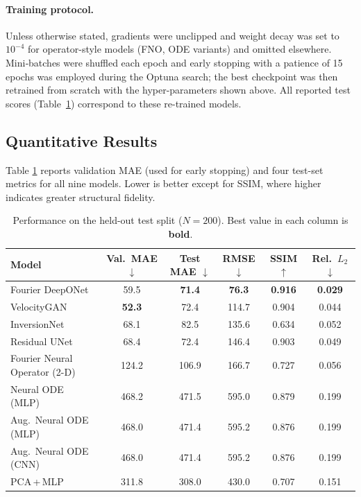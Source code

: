 \documentclass{article}
\begin{document}
\paragraph{Training protocol.}  
Unless otherwise stated, gradients were unclipped and weight decay was set to
$10^{-4}$ for operator-style models (FNO, ODE variants) and omitted elsewhere.
Mini‐batches were shuffled each epoch and early stopping with a
patience of 15 epochs was employed during the Optuna search; the best
checkpoint was then retrained from scratch with the hyper-parameters shown
above.  All reported test scores (Table~\ref{tab:quant}) correspond to these
re-trained models.

\subsection{Quantitative Results}

Table \ref{tab:quant} reports validation MAE (used for early stopping) and four
test-set metrics for all nine models.  Lower is better except for SSIM, where
higher indicates greater structural fidelity.

\begin{table}[H]
\centering
\small
\renewcommand{\arraystretch}{1.15}
\setlength{\tabcolsep}{5pt}
\begin{tabular}{@{}lccccc@{}}
\toprule
\textbf{Model} & \textbf{Val.\ MAE} $\downarrow$ & \textbf{Test MAE} $\downarrow$ & \textbf{RMSE} $\downarrow$ & \textbf{SSIM} $\uparrow$ & \textbf{Rel.\ $L_2$} $\downarrow$ \\
\midrule
Fourier DeepONet                & 59.5 & \textbf{71.4} & \textbf{76.3} & \textbf{0.916} & \textbf{0.029} \\
VelocityGAN                     & \textbf{52.3} & 72.4 & 114.7 & 0.904 & 0.044 \\
InversionNet                    & 68.1 & 82.5 & 135.6 & 0.634 & 0.052 \\
Residual UNet                   & 68.4 & 72.4 & 146.4 & 0.903 & 0.049 \\
Fourier Neural Operator (2-D)   & 124.2 & 106.9 & 166.7 & 0.727 & 0.056 \\
Neural ODE (MLP)                & 468.2 & 471.5 & 595.0 & 0.879 & 0.199 \\
Aug.\ Neural ODE (MLP)          & 468.0 & 471.4 & 595.2 & 0.876 & 0.199 \\
Aug.\ Neural ODE (CNN)          & 468.0 & 471.4 & 595.2 & 0.876 & 0.199 \\
PCA\,+\,MLP                     & 311.8 & 308.0 & 430.0 & 0.707 & 0.151 \\
\bottomrule
\end{tabular}
\caption{Performance on the held-out test split (\(N\!=\!200\)).
Best value in each column is \textbf{bold}.}
\label{tab:quant}
\end{table}
\end{document}
